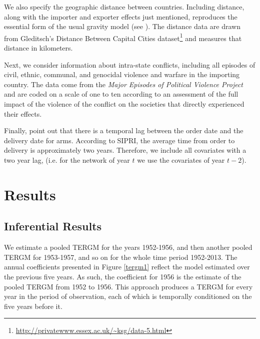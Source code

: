 \documentclass[12pt, letterpaper]{article}
\numberwithin{equation}{section}
\begin{document}
We also specify the geographic distance between countries. Including distance, along with the importer and exporter effects just mentioned, reproduces the essential form of the usual gravity model (see \cite{disdier2008}). The distance data are drawn from Gleditsch's Distance Between Capital Cities dataset\footnote{\url{http://privatewww.essex.ac.uk/~ksg/data-5.html}} and measures that distance in kilometers.

Next, we consider information about intra-state conflicts, including all episodes of civil, ethnic, communal, and genocidal violence and warfare in the importing country. 
The data come from the \textit{Major Episodes of Political Violence Project} \citep{Mars2014} and are coded on a scale of one to ten according to an assessment of the full impact of the violence of the conflict on the societies that directly experienced their effects. 
%

Finally, \citet{PerkNeum:10} point out that there is a temporal lag between the order date and the delivery date for arms. 
According to SIPRI, the average time from order to delivery is approximately two years. 
Therefore, we include all covariates with a two year lag, (i.e. for the network of year $t$ we use the covariates of year $t-2$).






\section{Results}\label{results}




   

\subsection{Inferential Results}

We estimate a pooled TERGM for the years 1952-1956, and then another pooled TERGM for 1953-1957, and so on for the whole time period 1952-2013. The annual coefficients presented in Figure \ref{tergm1} reflect the model estimated over the previous five years. As such, the coefficient for 1956 is the estimate of the pooled TERGM from 1952 to 1956. 
This approach produces a TERGM for every year in the period of observation, each of which is temporally conditioned on the five years before it. 
\end{document}
